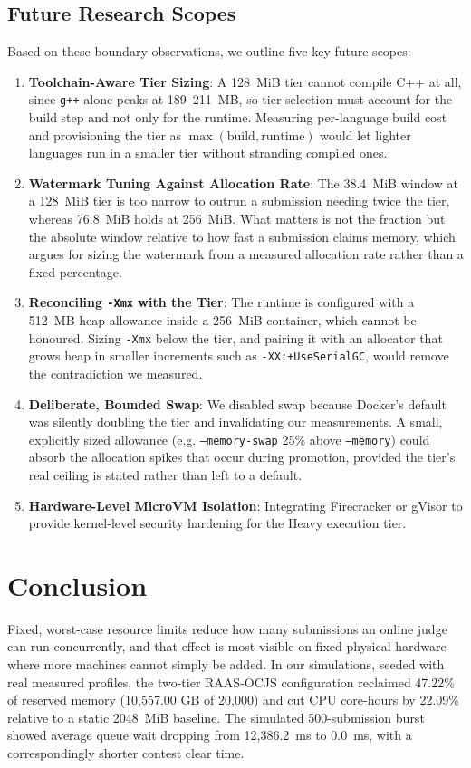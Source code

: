 \documentclass[conference]{IEEEtran}
\begin{document}
\subsection{Future Research Scopes}
Based on these boundary observations, we outline five key future scopes:
\begin{enumerate}
    \item \textbf{Toolchain-Aware Tier Sizing}: A 128~MiB tier cannot compile C++ at all, since \texttt{g++} alone peaks at 189--211~MB, so tier selection must account for the build step and not only for the runtime. Measuring per-language build cost and provisioning the tier as $\max(\text{build}, \text{runtime})$ would let lighter languages run in a smaller tier without stranding compiled ones.
    \item \textbf{Watermark Tuning Against Allocation Rate}: The 38.4~MiB window at a 128~MiB tier is too narrow to outrun a submission needing twice the tier, whereas 76.8~MiB holds at 256~MiB. What matters is not the fraction but the absolute window relative to how fast a submission claims memory, which argues for sizing the watermark from a measured allocation rate rather than a fixed percentage.
    \item \textbf{Reconciling \texttt{-Xmx} with the Tier}: The runtime is configured with a 512~MB heap allowance inside a 256~MiB container, which cannot be honoured. Sizing \texttt{-Xmx} below the tier, and pairing it with an allocator that grows heap in smaller increments such as \texttt{-XX:+UseSerialGC}, would remove the contradiction we measured.
    \item \textbf{Deliberate, Bounded Swap}: We disabled swap because Docker's default was silently doubling the tier and invalidating our measurements. A small, explicitly sized allowance (e.g. \texttt{--memory-swap} 25\% above \texttt{--memory}) could absorb the allocation spikes that occur during promotion, provided the tier's real ceiling is stated rather than left to a default.
    \item \textbf{Hardware-Level MicroVM Isolation}: Integrating Firecracker or gVisor to provide kernel-level security hardening for the Heavy execution tier.
\end{enumerate}

\section{Conclusion}
Fixed, worst-case resource limits reduce how many submissions an online judge can run concurrently, and that effect is most visible on fixed physical hardware where more machines cannot simply be added. In our simulations, seeded with real measured profiles, the two-tier RAAS-OCJS configuration reclaimed 47.22\% of reserved memory (10,557.00 GB of 20,000) and cut CPU core-hours by 22.09\% relative to a static 2048~MiB baseline. The simulated 500-submission burst showed average queue wait dropping from 12,386.2~ms to 0.0~ms, with a correspondingly shorter contest clear time.
\end{document}
